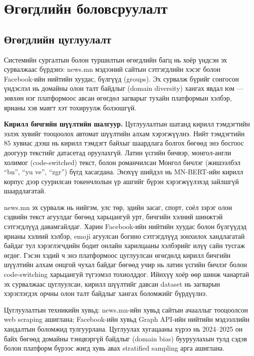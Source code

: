 
\chapter{Өгөгдлийн боловсруулалт}
\label{Chapter4}

\section{Өгөгдлийн цуглуулалт}

Системийн сургалтын болон туршилтын өгөгдлийн багц нь хоёр үндсэн эх
сурвалжаас бүрдэнэ: news.mn мэдээний сайтын сэтгэгдлийн хэсэг болон
Facebook-ийн нийтийн хуудас, бүлгүүд (groups). Эх сурвалж бүрийг сонгосон
үндэслэл нь домайны олон талт байдлыг (domain diversity) хангах явдал юм ---
зөвхөн нэг платформоос авсан өгөгдөл загварыг тухайн платформын хэлбэр, ярианы
хэв маягт хэт тохируулж болзошгүй.

\textbf{Кирилл бичгийн шүүлтийн шалгуур.} Цуглуулалтын шатанд кирилл
тэмдэгтийн эзлэх хувийг тооцоолох автомат шүүлтийн алхам хэрэгжүүлнэ. Нийт
тэмдэгтийн $85$ хувиас дээш нь кирилл тэмдэгт байхыг шаардлага болгох бөгөөд
энэ босгоос доогуур текстийг датасетад оруулахгүй. Латин үсгийн бичвэр,
монгол-англи холимог (code-switched) текст, болон романчилсан Монгол бичлэг
(жишээлбэл ``bn'', ``yu ve'', ``zgr'') бүгд хасагдана. Энэхүү шийдэл нь
MN-BERT-ийн кирилл корпус дээр суурилсан токенчлолын үр ашгийг бүрэн
хэрэгжүүлэхэд зайлшгүй шаардлагатай.

news.mn эх сурвалж нь нийгэм, улс төр, эдийн засаг, спорт, соёл зэрэг олон
сэдвийн текст агуулдаг бөгөөд харьцангуй урт, бичгийн хэлний шинжтэй
сэтгэгдлүүд давамгайлдаг. Харин Facebook-ийн нийтийн хуудас болон бүлгүүдэд
ярианы хэлний хэлбэр, emoji агуулсан богино сэтгэгдлүүд зонхилох хандлагатай
байдаг тул хэрэглэгчдийн бодит онлайн харилцааны хэлбэрийг илүү сайн тусгаж
өгдөг. Гэсэн хэдий ч энэ платформоос цуглуулсан өгөгдөлд кирилл бичгийн
шүүлтийн алхам онцгой чухал байдаг бөгөөд учир нь латин үсгийн бичлэг болон
code-switching харьцангуй түгээмэл тохиолддог. Ийнхүү хоёр өөр шинж чанартай
эх сурвалжаас цуглуулсан, кирилл шүүлтийг давсан dataset нь загварын хэрэглэгдэх
орчны олон талт байдлыг хангах боломжийг бүрдүүлнэ.

Цуглуулалтын техникийн хувьд: news.mn-ийн хувьд сайтын ачааллыг тооцоолсон
web scraping ашиглана; Facebook-ийн хувьд Graph API-ийн нийтийн мэдээллийн
хандалтын боломжид тулгуурлана. Цуглуулах хугацааны хүрээ нь 2024--2025 он
байх бөгөөд домайны тэнцвэргүй байдлыг (domain bias) бууруулахын тулд сэдэв
болон платформ бүрээс жигд хувь авах stratified sampling арга ашиглана.

